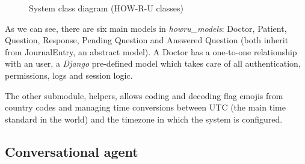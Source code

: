 \documentclass[12pt,english]{article}
\begin{document}
\begin{figure}[H]
    \caption{System class diagram (HOW-R-U classes)}
\end{figure}

As we can see, there are six main models in \emph{howru\_models}: Doctor, Patient, Question, Response, Pending Question and Answered Question (both inherit from JournalEntry, an abstract model). A Doctor has a one-to-one relationship with an user, a \emph{Django} pre-defined model which takes care of all authentication, permissions, logs and session logic.

The other submodule, helpers, allows coding and decoding flag emojis from country codes and managing time conversions between UTC (the main time standard in the world) and the timezone in which the system is configured.

\subsection{Conversational agent}
\end{document}

